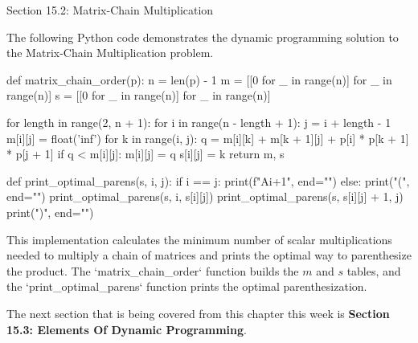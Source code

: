 \begin{notes}{Section 15.2: Matrix-Chain Multiplication}
    \begin{highlight}
        The following Python code demonstrates the dynamic programming solution to the Matrix-Chain Multiplication problem.
    \begin{code}[Python]
    def matrix_chain_order(p):
        n = len(p) - 1
        m = [[0 for _ in range(n)] for _ in range(n)]
        s = [[0 for _ in range(n)] for _ in range(n)]
    
        for length in range(2, n + 1):
            for i in range(n - length + 1):
                j = i + length - 1
                m[i][j] = float('inf')
                for k in range(i, j):
                    q = m[i][k] + m[k + 1][j] + p[i] * p[k + 1] * p[j + 1]
                    if q < m[i][j]:
                        m[i][j] = q
                        s[i][j] = k
        return m, s
    
    def print_optimal_parens(s, i, j):
        if i == j:
            print(f"A{i+1}", end="")
        else:
            print("(", end="")
            print_optimal_parens(s, i, s[i][j])
            print_optimal_parens(s, s[i][j] + 1, j)
            print(")", end="")
    \end{code}
        This implementation calculates the minimum number of scalar multiplications needed to multiply a chain of matrices and prints the optimal way to parenthesize the product. The `matrix\_chain\_order` 
        function builds the $m$ and $s$ tables, and the `print\_optimal\_parens` function prints the optimal parenthesization.
    \end{highlight}      
\end{notes}

The next section that is being covered from this chapter this week is \textbf{Section 15.3: Elements Of Dynamic Programming}.

